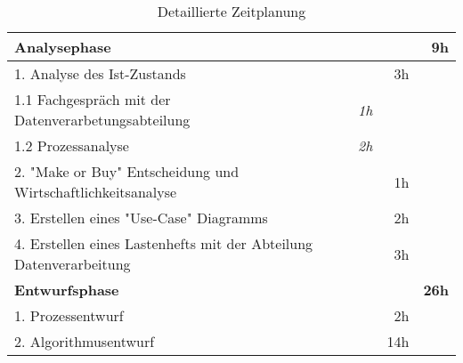\begin{table}[!htp]
\centering
\caption{Detaillierte Zeitplanung}
\label{table:zeitplanung}
\begin{tabular}{|lrrr|}
\hline
\rowcolor[HTML]{9698ED}
{\color[HTML]{FFFFFF} \textbf{Analysephase}}            & {\color[HTML]{FFFFFF} \textbf{}} & {\color[HTML]{FFFFFF} \textbf{}} & {\color[HTML]{FFFFFF} \textbf{9h}} \\ \hline
1. Analyse des Ist-Zustands                                        &                                  & 3h                               &                                               \\
\rowcolor[HTML]{BBDAFF}
1.1 Fachgespräch mit der Datenverarbetungsabteilung                & \textit{1h}                    &                                  &                                               \\
1.2 Prozessanalyse                                                 & \textit{2h}                    &                                  &                                               \\
\rowcolor[HTML]{BBDAFF}
2. "Make or Buy" Entscheidung und Wirtschaftlichkeitsanalyse       &                                  & 1h                               &                                               \\
3. Erstellen eines "Use-Case" Diagramms                            &                                  & 2h                               &                                               \\
\rowcolor[HTML]{BBDAFF}
4. Erstellen eines Lastenhefts mit der Abteilung Datenverarbeitung &                                  & 3h                               &                                               \\ \hline
\rowcolor[HTML]{9698ED}
{\color[HTML]{FFFFFF} \textbf{Entwurfsphase}}                    & {\color[HTML]{FFFFFF} }          & {\color[HTML]{FFFFFF} }          & {\color[HTML]{FFFFFF} \textbf{26h}}         \\ \hline
1. Prozessentwurf                                                  &                                  & 2h                               &                                               \\
\rowcolor[HTML]{BBDAFF}
2. Algorithmusentwurf                                              &                                  & 14h                              &                                               \\

\end{tabular}
\end{table}
